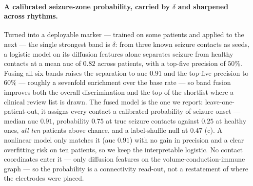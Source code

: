 \paragraph{A calibrated seizure-zone probability, carried by \(\delta\) and sharpened across rhythms.}
Turned into a deployable marker --- trained on some patients and applied to the next --- the single strongest band is \(\delta\): from three known seizure contacts as seeds, a logistic model on its diffusion features alone separates seizure from healthy contacts at a mean \gls{auc} of \(0.82\) across patients, with a top-five precision of \(50\%\). Fusing all six bands raises the separation to \gls{auc} \(0.91\) and the top-five precision to \(60\%\) --- roughly a sevenfold enrichment over the base rate --- so band fusion improves both the overall discrimination and the top of the shortlist where a clinical review list is drawn. The fused model is the one we report: leave-one-patient-out, it assigns every contact a calibrated probability of seizure onset --- median \gls{auc} \(0.91\), probability \(0.75\) at true seizure contacts against \(0.25\) at healthy ones, \emph{all ten} patients above chance, and a label-shuffle null at \(0.47\) (c). A nonlinear model only matches it (\gls{auc} \(0.91\)) with no gain in precision and a clear overfitting risk on ten patients, so we keep the interpretable logistic. No contact coordinates enter it --- only diffusion features on the volume-conduction-immune graph --- so the probability is a connectivity read-out, not a restatement of where the electrodes were placed.

